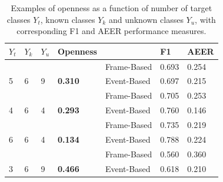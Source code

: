 \documentclass{ieeeaccess}
\begin{document}
\begin{table}
	\caption{Examples of openness as a function of number of target classes  $Y_{t}$, known classes $Y_{k}$ and unknown classes  $Y_{u}$, with corresponding F1 and AEER performance measures.}
	\centering
	\setlength{\tabcolsep}{6pt}
	\begin{tabular}{|p{10pt}|p{10pt}|p{10pt}|p{30pt}|p{45pt}|p{20pt}|p{20pt}|}
		\hline
		\textbf{$Y_{t}$}    & \textbf{$Y_{k}$}    & \textbf{$Y_{u}$}    & \textbf{Openness}                & \textbf{}                           & \textbf{F1}                   & \textbf{AEER}                 \\ \hline
		&                     &                     &                                  & \cellcolor[HTML]{C0C0C0}Frame-Based & \cellcolor[HTML]{C0C0C0}0.693 & \cellcolor[HTML]{C0C0C0}0.254 \\
		\multirow{-2}{*}{5} & \multirow{-2}{*}{6} & \multirow{-2}{*}{9} & \multirow{-2}{*}{\textbf{0.310}} & Event-Based                         & 0.697                         & 0.215                         \\
		&                     &                     &                                  & \cellcolor[HTML]{C0C0C0}Frame-Based & \cellcolor[HTML]{C0C0C0}0.705 & \cellcolor[HTML]{C0C0C0}0.253 \\
		\multirow{-2}{*}{4} & \multirow{-2}{*}{6} & \multirow{-2}{*}{4} & \multirow{-2}{*}{\textbf{0.293}} & Event-Based                         & 0.760                         & 0.146                         \\
		&                     &                     &                                  & \cellcolor[HTML]{C0C0C0}Frame-Based & \cellcolor[HTML]{C0C0C0}0.735 & \cellcolor[HTML]{C0C0C0}0.219 \\
		\multirow{-2}{*}{6} & \multirow{-2}{*}{6} & \multirow{-2}{*}{4} & \multirow{-2}{*}{\textbf{0.134}} & Event-Based                         & 0.788                         & 0.224                         \\
		&                     &                     &                                  & \cellcolor[HTML]{C0C0C0}Frame-Based & \cellcolor[HTML]{C0C0C0}0.560 & \cellcolor[HTML]{C0C0C0}0.360 \\
		\multirow{-2}{*}{3} & \multirow{-2}{*}{6} & \multirow{-2}{*}{9} & \multirow{-2}{*}{\textbf{0.466}} & Event-Based                         & 0.618                         & 0.210                         \\ \hline
	\end{tabular}
	\label{tab:table3}
\end{table}
\end{document}
